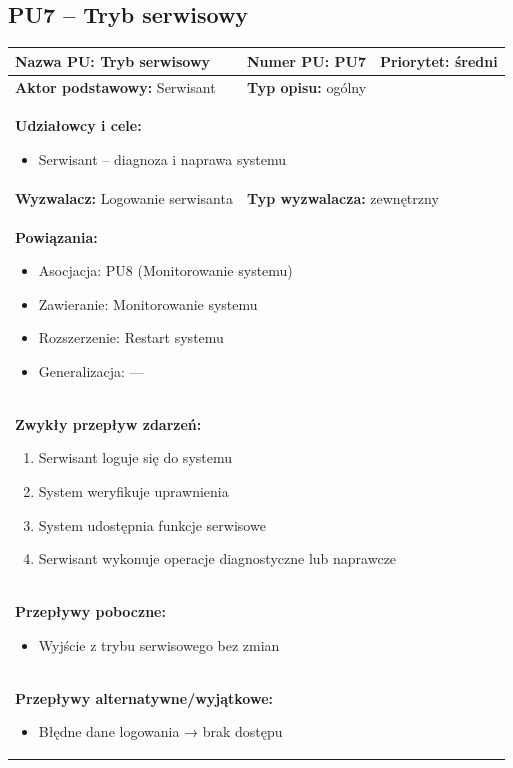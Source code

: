 \documentclass[a4paper,12pt]{article}
\begin{document}
\vspace{1cm}

\subsection{PU7 – Tryb serwisowy}

\begin{tabular}{|p{6cm}|p{4cm}|p{5cm}|}
\hline
\textbf{Nazwa PU:} Tryb serwisowy &
\textbf{Numer PU:} PU7 &
\textbf{Priorytet:} średni \\
\hline
\textbf{Aktor podstawowy:} Serwisant &
\multicolumn{2}{p{9cm}|}{\textbf{Typ opisu:} ogólny} \\
\hline
\multicolumn{3}{|p{15cm}|}{
\textbf{Udziałowcy i cele:}
\begin{itemize}
\item Serwisant – diagnoza i naprawa systemu
\end{itemize}
} \\
\hline
\textbf{Wyzwalacz:} Logowanie serwisanta &
\multicolumn{2}{p{9cm}|}{\textbf{Typ wyzwalacza:} zewnętrzny} \\
\hline
\multicolumn{3}{|p{15cm}|}{
\textbf{Powiązania:}
\begin{itemize}
\item Asocjacja: PU8 (Monitorowanie systemu)
\item Zawieranie: Monitorowanie systemu
\item Rozszerzenie: Restart systemu
\item Generalizacja: —
\end{itemize}
} \\
\hline
\multicolumn{3}{|p{15cm}|}{
\textbf{Zwykły przepływ zdarzeń:}
\begin{enumerate}
\item Serwisant loguje się do systemu
\item System weryfikuje uprawnienia
\item System udostępnia funkcje serwisowe
\item Serwisant wykonuje operacje diagnostyczne lub naprawcze
\end{enumerate}
} \\
\hline
\multicolumn{3}{|p{15cm}|}{
\textbf{Przepływy poboczne:}
\begin{itemize}
\item Wyjście z trybu serwisowego bez zmian
\end{itemize}
} \\
\hline
\multicolumn{3}{|p{15cm}|}{
\textbf{Przepływy alternatywne/wyjątkowe:}
\begin{itemize}
\item Błędne dane logowania → brak dostępu
\end{itemize}
} \\
\hline
\end{tabular}
\end{document}
